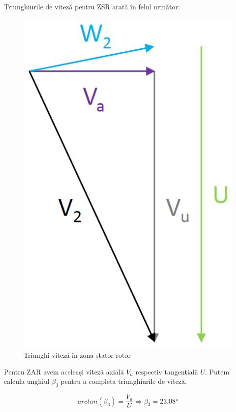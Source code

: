 Triunghiurile de viteză pentru ZSR arată în felul următor:

\begin{figure}[h!]
	\centering
	\includegraphics[scale=0.5]{figures/triunghi_viteza_ZSR.jpg}
	\caption{Triunghi viteză în zona stator-rotor}
	\label{Triunghi viteză în zona stator-rotor}
\end{figure}



Pentru ZAR avem aceleași viteză axială $V_a$ respectiv tangențială $U$. Putem calcula unghiul $\beta_3$ pentru a completa triunghiurile de viteză.

\begin{equation}
arctan(\beta_{3})=\frac{V_{a}}{U} \Rightarrow \beta_{3} =23.08\si{\degree}
\end{equation}

